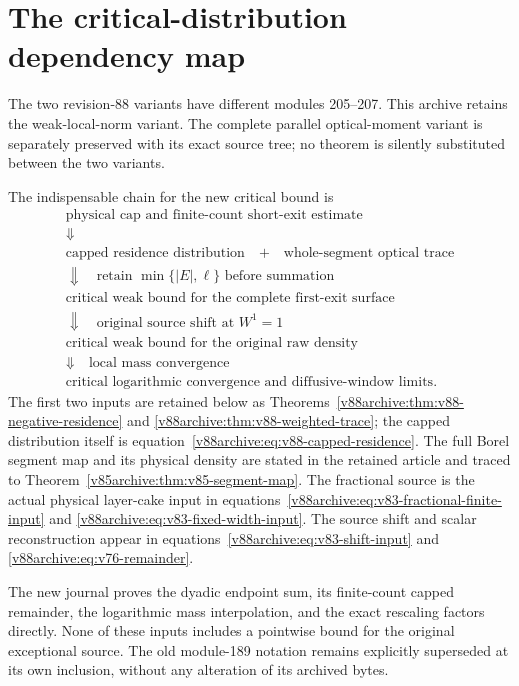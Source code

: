 \section{The critical-distribution dependency map}
\label{app:v89-dependencies}
The two revision-88 variants have different modules 205--207. This
archive retains the weak-local-norm variant. The complete parallel
optical-moment variant is separately preserved with its exact source
tree; no theorem is silently substituted between the two variants.

The indispensable chain for the new critical bound is
\[
 \begin{gathered}
 \text{physical cap and finite-count short-exit estimate}\\
 \Downarrow\\
 \text{capped residence distribution}
 \quad+\quad\text{whole-segment optical trace}\\
 \Downarrow\quad\text{retain }\min\{|E|,\ell\}\text{ before summation}\\
 \text{critical weak bound for the complete first-exit surface}\\
 \Downarrow\quad\text{original source shift at }W^1=1\\
 \text{critical weak bound for the original raw density}\\
 \Downarrow\quad\text{local mass convergence}\\
 \text{critical logarithmic convergence and diffusive-window limits}.
 \end{gathered}
\]
The first two inputs are retained below as
Theorems~\ref{v88archive:thm:v88-negative-residence} and
\ref{v88archive:thm:v88-weighted-trace}; the capped distribution
itself is equation~\eqref{v88archive:eq:v88-capped-residence}.
The full Borel segment map and its physical density are stated in
the retained article and traced to
Theorem~\ref{v85archive:thm:v85-segment-map}.
The fractional source is the actual physical layer-cake input in
equations~\eqref{v88archive:eq:v83-fractional-finite-input} and
\eqref{v88archive:eq:v83-fixed-width-input}.
The source shift and scalar reconstruction appear in
equations~\eqref{v88archive:eq:v83-shift-input} and
\eqref{v88archive:eq:v76-remainder}.

The new journal proves the dyadic endpoint sum, its finite-count
capped remainder, the logarithmic mass interpolation, and the exact
rescaling factors directly. None of these inputs includes a
pointwise bound for the original exceptional source. The old
module-189 notation remains explicitly superseded at its own
inclusion, without any alteration of its archived bytes.
